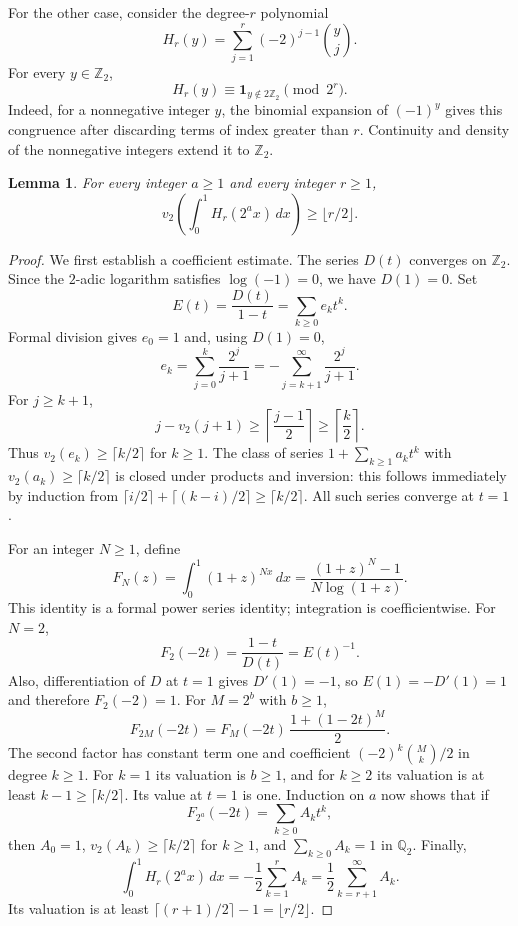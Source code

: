 \documentclass[11pt]{article}
\newtheorem{lemma}[theorem]{Lemma}
\newcommand{\vii}{v_2}
\newcommand{\Zii}{\mathbb Z_2}
\newcommand{\Qii}{\mathbb Q_2}
\begin{document}
For the other case, consider the degree-$r$ polynomial
\[
 H_r(y)=\sum_{j=1}^r(-2)^{j-1}\binom{y}{j}.
\]
For every $y\in\Zii$,
\begin{equation}\label{eq:parity}
 H_r(y)\equiv\boldsymbol1_{y\notin2\Zii}\pmod{2^r}.
\end{equation}
Indeed, for a nonnegative integer $y$, the binomial expansion of $(-1)^y$
gives this congruence after discarding terms of index greater than $r$.
Continuity and density of the nonnegative integers extend it to $\Zii$.

\begin{lemma}\label{lem:integral}
For every integer $a\geq1$ and every integer $r\geq1$,
\[
 \vii\left(\int_0^1H_r(2^a x)\,dx\right)\geq\lfloor r/2\rfloor.
\]
\end{lemma}
\begin{proof}
We first establish a coefficient estimate. The series $D(t)$ converges
on $\Zii$. Since the $2$-adic logarithm satisfies $\log(-1)=0$,
we have $D(1)=0$. Set
\[
 E(t)=\frac{D(t)}{1-t}=\sum_{k\geq0}e_k t^k.
\]
Formal division gives $e_0=1$ and, using $D(1)=0$,
\[
 e_k=\sum_{j=0}^k\frac{2^j}{j+1}
     =-\sum_{j=k+1}^\infty\frac{2^j}{j+1}.
\]
For $j\geq k+1$,
\[
 j-\vii(j+1)\geq\left\lceil\frac{j-1}{2}\right\rceil
                \geq\left\lceil\frac k2\right\rceil.
\]
Thus $\vii(e_k)\geq\lceil k/2\rceil$ for $k\geq1$.
The class of series $1+\sum_{k\geq1}a_k t^k$ with
$\vii(a_k)\geq\lceil k/2\rceil$ is closed under products and inversion:
this follows immediately by induction from
$\lceil i/2\rceil+\lceil(k-i)/2\rceil\geq\lceil k/2\rceil$.
All such series converge at $t=1$.

For an integer $N\geq1$, define
\[
 F_N(z)=\int_0^1(1+z)^{Nx}\,dx
       =\frac{(1+z)^N-1}{N\log(1+z)}.
\]
This identity is a formal power series identity; integration is coefficientwise.
For $N=2$,
\[
 F_2(-2t)=\frac{1-t}{D(t)}=E(t)^{-1}.
\]
Also, differentiation of $D$ at $t=1$ gives $D'(1)=-1$,
so $E(1)=-D'(1)=1$ and therefore $F_2(-2)=1$.
For $M=2^b$ with $b\geq1$,
\[
 F_{2M}(-2t)=F_M(-2t)\,\frac{1+(1-2t)^M}{2}.
\]
The second factor has constant term one and coefficient
$(-2)^k\binom{M}{k}/2$ in degree $k\geq1$.
For $k=1$ its valuation is $b\geq1$, and for $k\geq2$ its valuation
is at least $k-1\geq\lceil k/2\rceil$.
Its value at $t=1$ is one. Induction on $a$ now shows that if
\[
 F_{2^a}(-2t)=\sum_{k\geq0}A_k t^k,
\]
then $A_0=1$, $\vii(A_k)\geq\lceil k/2\rceil$ for $k\geq1$,
and $\sum_{k\geq0}A_k=1$ in $\Qii$.
Finally,
\[
 \int_0^1 H_r(2^a x)\,dx
  =-\frac12\sum_{k=1}^r A_k
  =\frac12\sum_{k=r+1}^\infty A_k.
\]
Its valuation is at least $\lceil(r+1)/2\rceil-1=\lfloor r/2\rfloor$.
\end{proof}
\end{document}
